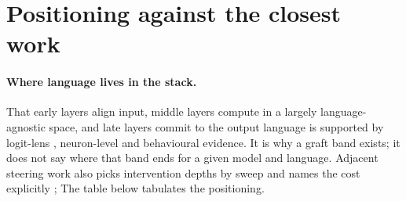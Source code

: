 \documentclass[10pt]{article}
\theoremstyle{plain}
\theoremstyle{definition}
\theoremstyle{remark}
\begin{document}
\section{Positioning against the closest work}
\label{app:positioning}

\paragraph{Where language lives in the stack.}
That early layers align input, middle layers compute in a largely
language-agnostic space, and late layers commit to the output language is
supported by logit-lens \citep{wendler2024llamas}, neuron-level
\citep{tang2024langneurons} and behavioural \citep{etxaniz2024think,
schut2025english, zhao2024multilingualism} evidence. It is why a graft band
exists; it does not say where that band ends for a given model and language.
Adjacent steering work also picks intervention depths by sweep and names the cost
explicitly \citep{multilingualsteering2026, linguamap2026};
The table below tabulates the positioning.
\end{document}
